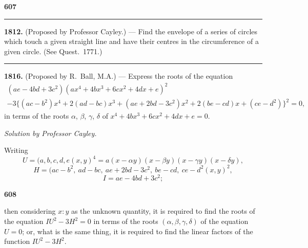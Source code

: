 \documentclass[12pt,a4paper]{article}
\theoremstyle{plain}
\begin{document}
\newpage
\noindent\textbf{607}

\noindent\rule{\textwidth}{0.4pt}
\vspace{0.3cm}

\noindent[Vol.~IV. pp.~108, 109.]

\vspace{0.3cm}
\noindent\textbf{1812.} (Proposed by Professor Cayley.) --- Find the envelope of a series of circles which touch a given straight line and have their centres in the circumference of a given circle. (See Quest.~1771.)

\vspace{0.5cm}
\noindent\rule{\textwidth}{0.4pt}
\vspace{0.3cm}

\noindent[Vol.~IV. pp.~108, 109.]

\vspace{0.3cm}
\noindent\textbf{1816.} (Proposed by R.~Ball, M.A.) --- Express the roots of the equation
\begin{multline*}
(ae-4bd+3c^2)(ax^4+4bx^3+6cx^2+4dx+e)^2 \\
- 3\{(ac-b^2)x^4+2(ad-bc)x^3+(ae+2bd-3c^2)x^2+2(be-cd)x+(ce-d^2)\}^2 = 0,
\end{multline*}
in terms of the roots $\alpha$, $\beta$, $\gamma$, $\delta$ of $x^4+4bx^3+6cx^2+4dx+e=0$.

\textit{Solution by Professor Cayley.}

Writing
\[U = (a,b,c,d,e\!\!\!(x,y)^4 = a(x-\alpha y)(x-\beta y)(x-\gamma y)(x-\delta y),\]
\[H = (ac-b^2,\ ad-bc,\ ae+2bd-3c^2,\ be-cd,\ ce-d^2\!\!\!(x,y)^2,\]
\[I = ae-4bd+3c^2;\]

\newpage
\noindent\textbf{608}

then considering $x:y$ as the unknown quantity, it is required to find the roots of the equation $IU^2-3H^2=0$ in terms of the roots $(\alpha,\beta,\gamma,\delta)$ of the equation $U=0$; or, what is the same thing, it is required to find the linear factors of the function $IU^2-3H^2$.
\end{document}
